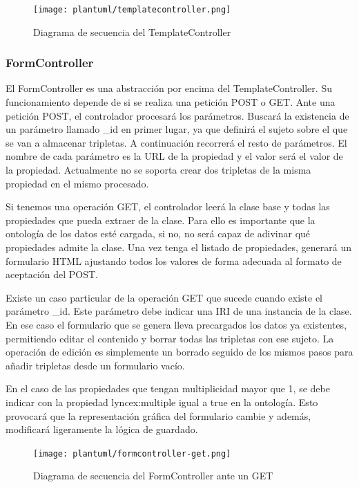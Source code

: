 \documentclass[12pt]{report} %
\begin{document}
\begin{figure}[h]
    \centering
    \texttt{[image: plantuml/templatecontroller.png]}
    \caption{Diagrama de secuencia del TemplateController}
    \label{fig:templatecontroller}
\end{figure}

\subsubsection{FormController}
El FormController es una abstracción por encima del TemplateController.
Su funcionamiento depende de si se realiza una petición POST o GET. Ante una petición POST, el controlador procesará los parámetros.
Buscará la existencia de un parámetro llamado \_id en primer lugar, ya que definirá el sujeto sobre el que se van a almacenar tripletas.
A continuación recorrerá el resto de parámetros. El nombre de cada parámetro es la URL de la propiedad y el valor será el valor de la propiedad.
Actualmente no se soporta crear dos tripletas de la misma propiedad en el mismo procesado.

Si tenemos una operación GET, el controlador leerá la clase base y todas las propiedades que pueda extraer de la clase. Para ello es importante que la ontología de los datos esté cargada, si no, no será capaz de adivinar qué propiedades admite la clase.
Una vez tenga el listado de propiedades, generará un formulario HTML ajustando todos los valores de forma adecuada al formato de aceptación del POST.

Existe un caso particular de la operación GET que sucede cuando existe el parámetro \_id. Este parámetro debe indicar una IRI de una instancia de la clase. En ese caso el formulario que se genera lleva precargados los datos ya existentes, permitiendo editar el contenido y borrar todas las tripletas con ese sujeto. La operación de edición es simplemente un borrado seguido de los mismos pasos para añadir tripletas desde un formulario vacío.

En el caso de las propiedades que tengan multiplicidad mayor que 1, se debe indicar con la propiedad lyncex:multiple igual a true en la ontología. Esto provocará que la representación gráfica del formulario cambie y además, modificará ligeramente la lógica de guardado.

\begin{figure}[h]
    \centering
    \texttt{[image: plantuml/formcontroller-get.png]}
    \caption{Diagrama de secuencia del FormController ante un GET}
    \label{fig:formcontrollerget}
\end{figure}
\end{document}
